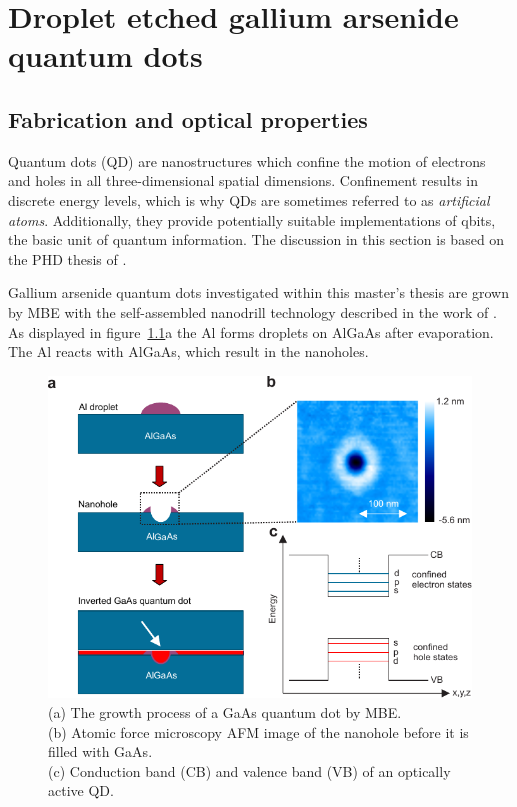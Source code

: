 \chapter{Droplet etched gallium arsenide quantum dots}
\label{chapter:quantum-dot}

\section{Fabrication and optical properties}

Quantum dots (\acs{QD}) are nanostructures which confine the motion of electrons and holes in all three-dimensional spatial dimensions.
Confinement results in discrete energy levels, which is why \acp{QD} are sometimes referred to as \textit{artificial atoms}.
Additionally, they provide potentially suitable implementations of qbits, the basic unit of quantum information.
The discussion in this section is based on the PHD thesis of \textcite{huber_gaas_2019}.

Gallium arsenide quantum dots investigated within this master's thesis are grown by \ac{MBE} with the self-assembled nanodrill technology described in the work of \textcite{wang_nanoholes_2007}.
As displayed in figure~\ref{fig:droplet-etched-gaas-qds}a the \ac{Al} forms droplets on AlGaAs after evaporation.
The \ac{Al} reacts with AlGaAs, which result in the nanoholes.


\begin{figure}[H]
	\centering
	\includegraphics[width=0.8\linewidth]{figures/quantum-dot/droplet-etched-gaas-qds}
	\caption[Droplet etched GaAs quantum dots.]{(a) The growth process of a GaAs quantum dot by \ac{MBE}.\\
	(b) Atomic force microscopy \acs{AFM} image of the nanohole before it is filled with GaAs.\\
    (c) Conduction band (CB) and valence band (VB) of an optically active \ac{QD}.~\cite{huber_gaas_2019}}
	\label{fig:droplet-etched-gaas-qds}
\end{figure}



